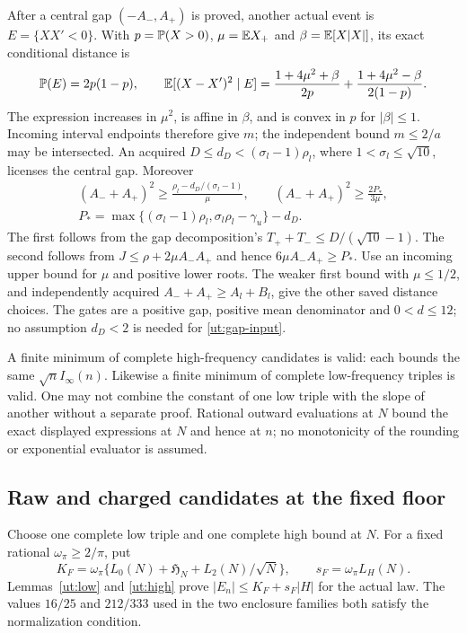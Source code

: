 After a central gap $(-A_-,A_+)$ is proved, another actual event is
$E=\{XX'<0\}$. With $p=\mathbb P(X>0)$, $\mu=\mathbb E X_+$ and
$\beta=\mathbb E[X|X|]$, its exact conditional distance is
\[
 \mathbb P(E)=2p(1-p),\qquad
 \mathbb E[(X-X')^2\mid E]
 =\frac{1+4\mu^2+\beta}{2p}
  +\frac{1+4\mu^2-\beta}{2(1-p)}.
\]
The expression increases in $\mu^2$, is affine in $\beta$, and is
convex in $p$ for $|\beta|\le1$. Incoming interval endpoints
therefore give $m$; the independent bound $m\le2/a$ may be intersected.
An acquired $D\le d_D<(\sigma_l-1)\rho_l$, where
$1<\sigma_l\le\sqrt{10}$, licenses the central gap. Moreover
\begin{equation}\label{ut:gap-input}
\begin{gathered}
 (A_-+A_+)^2\ge\frac{\rho_l-d_D/(\sigma_l-1)}{\mu},\qquad
 (A_-+A_+)^2\ge\frac{2P_*}{3\mu},\\
 P_* =\max\{(\sigma_l-1)\rho_l,\sigma_l\rho_l-\gamma_u\}-d_D.
\end{gathered}
\end{equation}
The first follows from the gap decomposition's
$T_++T_-\le D/(\sqrt{10}-1)$.
The second follows from
$J\le\rho+2\mu A_-A_+$ and hence $6\mu A_-A_+\ge P_*$.
Use an incoming upper bound for $\mu$ and positive lower roots.
The weaker first bound with $\mu\le1/2$, and independently acquired
$A_-+A_+\ge A_l+B_l$, give the other saved distance choices.
The gates are a positive gap, positive mean denominator and $0<d\le12$;
no assumption $d_D<2$ is needed for \eqref{ut:gap-input}.

A finite minimum of complete high-frequency candidates is valid:
each bounds the same $\sqrt n I_\infty(n)$.
Likewise a finite minimum of complete low-frequency triples is valid.
One may not combine the constant of one low triple with the slope of
another without a separate proof. Rational outward evaluations at
$N$ bound the exact displayed expressions at $N$ and hence at $n$;
no monotonicity of the rounding or exponential evaluator is assumed.

\subsection{Raw and charged candidates at the fixed floor}

Choose one complete low triple and one complete high bound at $N$.
For a fixed rational $\omega_\pi\ge2/\pi$, put
\begin{equation}\label{ut:fourier-floor}
 K_F=\omega_\pi\{L_0(N)+\mathfrak H_N+L_2(N)/\sqrt N\},
 \qquad s_F=\omega_\pi L_H(N).
\end{equation}
Lemmas~\ref{ut:low} and \ref{ut:high} prove
$|E_n|\le K_F+s_F|H|$ for the actual law.
The values $16/25$ and $212/333$ used in the two enclosure families
both satisfy the normalization condition.

